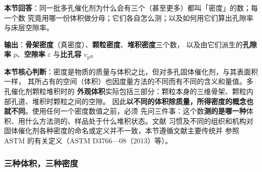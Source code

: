 \begin{probout}
\textbf{本节回答}：同一批多孔催化剂为什么会有三个（甚至更多）都叫「密度」的数；每一个数
究竟用哪一份体积做分母；它们各自怎么测；以及如何用它们算出孔隙率与床层空隙率。

\textbf{输出}：\textbf{骨架密度}（真密度）、\textbf{颗粒密度}、\textbf{堆积密度}三个数，
以及由它们派生的\textbf{孔隙率} $p$、\textbf{空隙率} $\varepsilon$ 与\textbf{比孔容}
$v_{\mathrm{p}}$。

\textbf{本节核心判断}：密度是物质的质量与体积之比，但对多孔固体催化剂，与其表面积一样，
其所占有的空间（体积）也因度量方法的不同而有不同的含义和量值。多孔催化剂颗粒堆积时的
\textbf{外观体积}实际包括三部分：颗粒本身的三维骨架、颗粒内部孔道、堆积时颗粒之间的空隙。
因此\textbf{以不同的体积除质量，所得密度的概念也就不同}。使用任何一个密度数值之前，必须
先问三件事：这个数\textbf{测的是哪一种}体积、用什么方法测的、样品处于什么堆积状态。文献
习惯及不同的组织和机构对固体催化剂各种密度的命名或定义并不一致，本节遵循文献主要传统并
参照 ASTM 的有关定义（ASTM D3766—08（2013）等）。
\end{probout}

\subsubsection{三种体积，三种密度}

